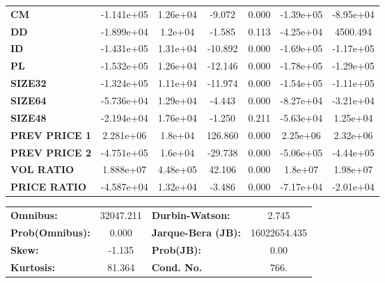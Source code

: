 \documentclass{article}
\begin{document}
\begin{center}
\begin{tabular}{lcccccc}
\textbf{CM}    &   -1.141e+05  &     1.26e+04     &    -9.072  &         0.000        &    -1.39e+05    &    -8.95e+04     \\
\textbf{DD}    &   -1.899e+04  &      1.2e+04     &    -1.585  &         0.113        &    -4.25e+04    &     4500.494     \\
\textbf{ID}    &   -1.431e+05  &     1.31e+04     &   -10.892  &         0.000        &    -1.69e+05    &    -1.17e+05     \\
\textbf{PL}    &   -1.532e+05  &     1.26e+04     &   -12.146  &         0.000        &    -1.78e+05    &    -1.29e+05     \\
\textbf{SIZE32}    &   -1.324e+05  &     1.11e+04     &   -11.974  &         0.000        &    -1.54e+05    &    -1.11e+05     \\
\textbf{SIZE64}   &   -5.736e+04  &     1.29e+04     &    -4.443  &         0.000        &    -8.27e+04    &    -3.21e+04     \\
\textbf{SIZE48}   &   -2.194e+04  &     1.76e+04     &    -1.250  &         0.211        &    -5.63e+04    &     1.25e+04     \\
\textbf{PREV PRICE 1}   &    2.281e+06  &      1.8e+04     &   126.860  &         0.000        &     2.25e+06    &     2.32e+06     \\
\textbf{PREV PRICE 2}   &   -4.751e+05  &      1.6e+04     &   -29.738  &         0.000        &    -5.06e+05    &    -4.44e+05     \\
\textbf{VOL RATIO}   &    1.888e+07  &     4.48e+05     &    42.106  &         0.000        &      1.8e+07    &     1.98e+07     \\
\textbf{PRICE RATIO}   &   -4.587e+04  &     1.32e+04     &    -3.486  &         0.000        &    -7.17e+04    &    -2.01e+04     \\
\bottomrule
\end{tabular}
\begin{tabular}{lclc}
\textbf{Omnibus:}       & 32047.211 & \textbf{  Durbin-Watson:     } &      2.745    \\
\textbf{Prob(Omnibus):} &    0.000  & \textbf{  Jarque-Bera (JB):  } & 16022654.435  \\
\textbf{Skew:}          &   -1.135  & \textbf{  Prob(JB):          } &       0.00    \\
\textbf{Kurtosis:}      &   81.364  & \textbf{  Cond. No.          } &       766.    \\
\bottomrule
\end{tabular}
\end{center}
\end{document}
